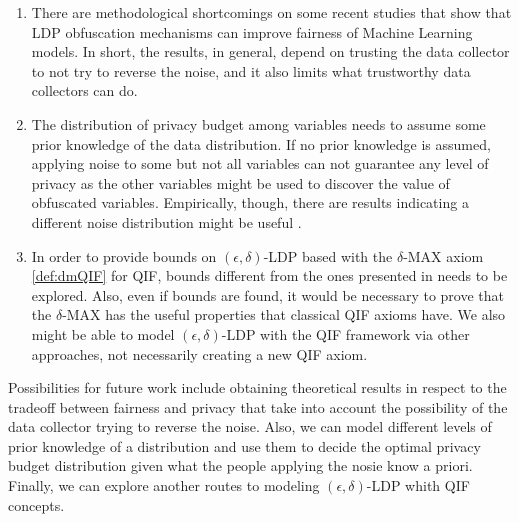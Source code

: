 \documentclass[conference]{IEEEtran}
\begin{document}
\begin{enumerate}
	\item There are methodological shortcomings on some recent studies that show that LDP obfuscation mechanisms can improve fairness of Machine Learning models. In short, the results, in general, depend on trusting the data collector to not try to reverse the noise, and it also limits what trustworthy data collectors can do.
	\item The distribution of privacy budget among variables needs to assume some prior knowledge of the data distribution. If no prior knowledge is assumed, applying noise to some but not all variables can not guarantee any level of privacy as the other variables might be used to discover the value of obfuscated variables. Empirically, though, there are results indicating a different noise distribution might be useful \cite{arcolezi2023local}.
	\item In order to provide bounds on $(\epsilon,\delta)$-LDP based with the $\delta$-MAX axiom \ref{def:dmQIF} for QIF, bounds different from the ones presented in \cite{fernandes2024explaining} needs to be explored. Also, even if bounds are found, it would be necessary to prove that the $\delta$-MAX has the useful properties that classical QIF axioms have. We also might be able to model $(\epsilon,\delta)$-LDP with the QIF framework via other approaches, not necessarily creating a new QIF axiom.
\end{enumerate}

Possibilities for future work include obtaining theoretical results in respect to the tradeoff between fairness and privacy that take into account the possibility of the data collector trying to reverse the noise. Also, we can model different levels of prior knowledge of a distribution and use them to decide the optimal privacy budget distribution given what the people applying the nosie know a priori. Finally, we can explore another routes to modeling $(\epsilon,\delta)$-LDP whith QIF concepts.



\end{document}
